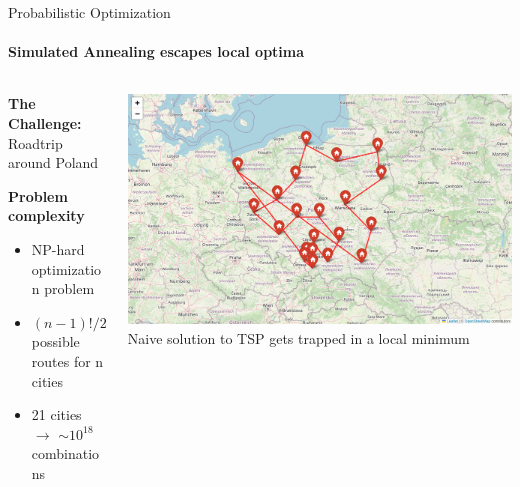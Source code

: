 \documentclass{beamer}
\begin{document}
\begin{frame}{Probabilistic Optimization}
  \framesubtitle{Simulated Annealing escapes local optima}
  \begin{columns}[c]
    \begin{column}{0.4\textwidth}
      \textbf{The Challenge:} Roadtrip around Poland
      \vspace{0.5cm}

      \textbf{Problem complexity}
      \begin{itemize}
        \item NP-hard optimization problem
        \item $(n-1)!/2$ possible routes for n cities
        \item 21 cities $\to$ $\sim10^{18}$ combinations
      \end{itemize}
    \end{column}
    \begin{column}{0.6\textwidth}
      \begin{center}
        \includegraphics[width=\textwidth]{images/tsp-naive.png}
        \\[0.2cm]
        \small{Naive solution to TSP gets trapped in a local minimum}
      \end{center}
    \end{column}
  \end{columns}
\end{frame}
\end{document}
